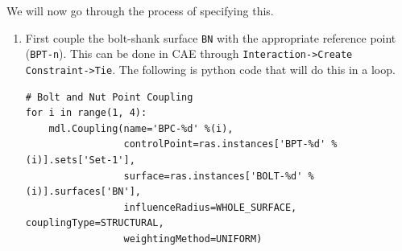 \documentclass[11pt]{article}
\begin{document}
We will now go through the process of specifying this.
\begin{enumerate}
\item First couple the bolt-shank surface \texttt{BN} with the appropriate reference point (\texttt{BPT-n}).
This can be done in CAE through \texttt{Interaction->Create Constraint->Tie}.
The following is python code that will do this in a loop.
\begin{verbatim}
# Bolt and Nut Point Coupling
for i in range(1, 4):
    mdl.Coupling(name='BPC-%d' %(i),
                 controlPoint=ras.instances['BPT-%d' %(i)].sets['Set-1'],
                 surface=ras.instances['BOLT-%d' %(i)].surfaces['BN'],
                 influenceRadius=WHOLE_SURFACE, couplingType=STRUCTURAL,
                 weightingMethod=UNIFORM)


\end{verbatim}
\end{enumerate}
\end{document}
